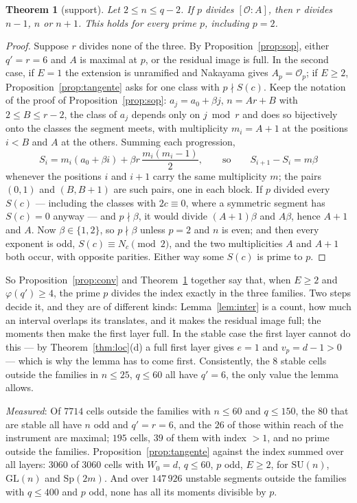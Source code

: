 \documentclass[11pt,a4paper]{article}
\newtheorem{theorem}{Theorem}
\theoremstyle{definition}
\newcommand{\Sp}{\mathrm{Sp}}
\newcommand{\SU}{\mathrm{SU}}
\newcommand{\GL}{\mathrm{GL}}
\newcommand{\cO}{\mathcal{O}}
\newcommand{\medido}[1]{\emph{Measured}: #1}
\begin{document}
\begin{theorem}[support]\label{thm:sop}
Let $2\le n\le q-2$. If $p$ divides $[\cO:A]$, then $r$ divides $n-1$, $n$ or $n+1$. This holds for
every prime $p$, including $p=2$.
\end{theorem}

\begin{proof}
Suppose $r$ divides none of the three. By Proposition~\ref{prop:sop}, either $q'=r=6$ and $A$ is
maximal at $p$, or the residual image is full. In the second case, if $E=1$ the extension is
unramified and Nakayama gives $A_p=\cO_p$; if $E\ge2$, Proposition~\ref{prop:tangente} asks for one
class with $p\nmid S(c)$. Keep the notation of the proof of Proposition~\ref{prop:sop}:
$a_j=a_0+\beta j$, $n=Ar+B$ with $2\le B\le r-2$, the class of $a_j$ depends only on $j\bmod r$ and
does so bijectively onto the classes the segment meets, with multiplicity $m_i=A+1$ at the
positions $i<B$ and $A$ at the others. Summing each progression,
\[
S_i=m_i(a_0+\beta i)+\beta r\,\frac{m_i(m_i-1)}2,\qquad\text{so}\qquad S_{i+1}-S_i=m\beta
\]
whenever the positions $i$ and $i+1$ carry the same multiplicity $m$; the pairs $(0,1)$ and
$(B,B+1)$ are such pairs, one in each block. If $p$ divided every $S(c)$ --- including the classes
with $2c\equiv0$, where a symmetric segment has $S(c)=0$ anyway --- and $p\nmid\beta$, it would
divide $(A+1)\beta$ and $A\beta$, hence $A+1$ and $A$. Now $\beta\in\{1,2\}$, so $p\nmid\beta$ unless
$p=2$ and $n$ is even; and then every exponent is odd, $S(c)\equiv N_c\pmod2$, and the two
multiplicities $A$ and $A+1$ both occur, with opposite parities. Either way some $S(c)$ is prime to
$p$.
\end{proof}

\noindent So Proposition~\ref{prop:conv} and Theorem~\ref{thm:sop} together say that, when $E\ge2$
and $\varphi(q')\ge4$, the prime $p$ divides the index exactly in the three families. Two steps
decide it, and they are of different kinds: Lemma~\ref{lem:inter} is a count, how much an interval
overlaps its translates, and it makes the residual image full; the moments then make the first layer
full. In the stable case the first layer cannot do this --- by Theorem~\ref{thm:loc}(d) a full first
layer gives $e=1$ and $v_p=d-1>0$ --- which is why the lemma has to come first. Consistently, the
$8$ stable cells outside the families in $n\le25$, $q\le60$ all have $q'=6$, the only value the lemma
allows.

\medido{Of $7714$ cells outside the families with $n\le60$ and $q\le150$, the $80$ that are stable
all have $n$ odd and $q'=r=6$, and the $26$ of those within reach of the instrument are maximal;
$195$ cells, $39$ of them with index $>1$, and no prime outside the families. Proposition~\ref{prop:tangente}
against the index summed over all layers: $3060$ of $3060$ cells with $W_0=d$, $q\le60$, $p$ odd,
$E\ge2$, for $\SU(n)$, $\GL(n)$ and $\Sp(2m)$. And over $147\,926$ unstable segments outside the
families with $q\le400$ and $p$ odd, none has all its moments divisible by $p$.}
\end{document}
